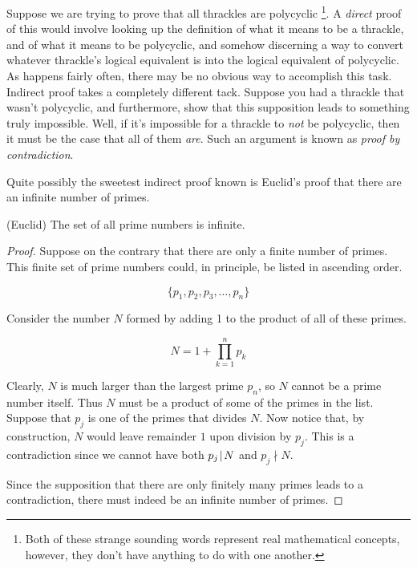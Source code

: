 Suppose we are trying to prove that all thrackles are polycyclic
\footnote{Both of these strange sounding words represent real 
mathematical concepts, however, they don't have anything to do 
with one another.}.
A {\em direct} proof of this would involve looking up the definition
of what it means to be a thrackle, and of what it means to be polycyclic,
and somehow discerning a way to convert whatever thrackle's logical equivalent
is into the logical equivalent of polycyclic.  As happens fairly often,
there may be no obvious way to accomplish this task.  
Indirect proof takes 
a completely different tack.  Suppose you had a thrackle that wasn't 
polycyclic, and furthermore, show that this supposition leads to something
truly impossible.  Well, if it's impossible for a thrackle to {\em not} be
polycyclic, then it must be the case that all of them {\em are}. 
Such an argument is known as 
\emph{proof by contradiction}.

Quite possibly the sweetest indirect proof known is Euclid's proof that there
are an infinite number of primes.  

\begin{thm} (Euclid) The set of all prime numbers is infinite.
\end{thm}

\begin{proof}
Suppose on the contrary that there are only a finite number
of primes.  This finite set of prime numbers could, in principle, be listed
in ascending order.

\[  \{ p_1, p_2, p_3, \ldots , p_n \} \]

Consider the number $N$ formed by adding 1 to the product of all of these 
primes.

\[ N = 1 + \prod_{k=1}^n p_k \]

Clearly, $N$ is much larger than the largest prime $p_n$, so $N$ cannot
be a prime number itself.  Thus $N$ must be a product of some of the 
primes in the list.  Suppose that $p_j$ is one of the primes that 
divides $N$.  Now notice that, by construction, $N$ would leave remainder
$1$ upon division by $p_j$.  This is a contradiction since we cannot have
both $p_j \!\mid\! N$ and $p_j \nmid N$. 

Since the supposition that there are only finitely many primes leads to
a contradiction, there must indeed be an infinite number of primes.

\end{proof}

